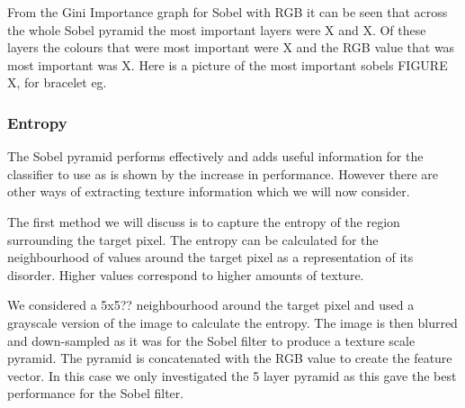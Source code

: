 \documentclass[12pt]{IIBproject}
\begin{document}
From the Gini Importance graph for Sobel with RGB it can be seen that across the whole Sobel pyramid the most important layers were X and X. Of these layers the colours that were most important were X and the RGB value that was most important was X. Here is a picture of the most important sobels FIGURE X, for bracelet eg.

 



\subsubsection{Entropy}
The Sobel pyramid performs effectively and adds useful information for the classifier to use as is shown by the increase in performance. However there are other ways of extracting texture information which we will now consider.
 
The first method we will discuss is to capture the entropy of the region surrounding the target pixel. The entropy can be calculated for the neighbourhood of values around the target pixel as a representation of its disorder\cite{jernigan1984entropy}. Higher values correspond to higher amounts of texture. 

We considered a 5x5?? neighbourhood around the target pixel and used a grayscale version of the image to calculate the entropy. The image is then blurred and down-sampled as it was for the Sobel filter to produce a texture scale pyramid. The pyramid is concatenated with the RGB value to create the feature vector. In this case we only investigated the 5 layer pyramid as this gave the best performance for the Sobel filter. 
\end{document}
